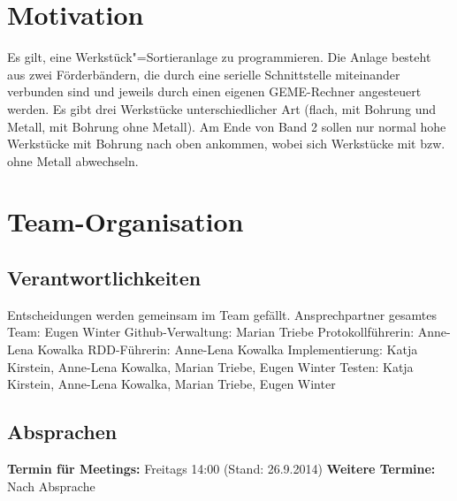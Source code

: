\documentclass[oneside,a4paper,titlepage]{scrartcl} %
\begin{document}
\newpage

\pagestyle{empty}
\tableofcontents

\newpage

\pagestyle{plain}
\setcounter{page}{1}

\section{Motivation}
Es gilt, eine Werkstück"=Sortieranlage zu programmieren. Die Anlage besteht aus zwei
Förderbändern, die durch eine serielle Schnittstelle miteinander verbunden sind und jeweils durch
einen eigenen GEME-Rechner angesteuert werden.
Es gibt drei Werkstücke unterschiedlicher Art (flach, mit Bohrung und Metall, mit Bohrung ohne
Metall). Am Ende von Band 2 sollen nur normal hohe Werkstücke mit Bohrung nach oben
ankommen, wobei sich Werkstücke mit bzw. ohne Metall abwechseln.

\section{Team-Organisation}

\subsection{Verantwortlichkeiten}
Entscheidungen werden gemeinsam im Team gefällt.\newline
Ansprechpartner gesamtes Team: Eugen Winter\newline
Github-Verwaltung: Marian Triebe\newline
Protokollführerin: Anne-Lena Kowalka\newline
RDD-Führerin: Anne-Lena Kowalka\newline
Implementierung: Katja Kirstein, Anne-Lena Kowalka, Marian Triebe, Eugen Winter\newline
Testen: Katja Kirstein, Anne-Lena Kowalka, Marian Triebe, Eugen Winter\newline

\subsection{Absprachen}
\textbf{Termin für Meetings:} Freitags 14:00 (Stand: 26.9.2014)\newline
\textbf{Weitere Termine:} Nach Absprache
\end{document}
